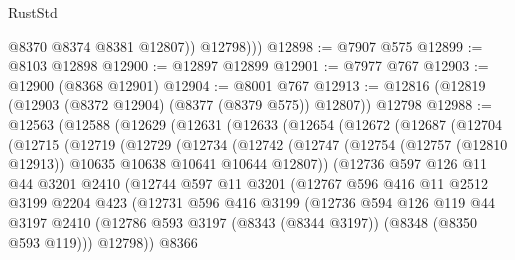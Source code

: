 \begin{lexlean}{RustStd}
\begin{coremodule}
              @8370
              @8374
              @8381
              @12807))
          @12798)))
@12898 := @7907 @575
@12899 := @8103 @12898
@12900 := @12897 @12899
@12901 := @7977 @767
@12903 := @12900 (@8368 @12901)
@12904 := @8001 @767
@12913 := @12816 (@12819 (@12903 (@8372 @12904) (@8377 (@8379 @575)) @12807)) @12798
@12988 := @12563
    (@12588
      (@12629
        (@12631
          (@12633
            (@12654
              (@12672
                (@12687
                  (@12704
                    (@12715
                      (@12719
                        (@12729
                          (@12734
                            (@12742
                              (@12747
                                (@12754
                                  (@12757 (@12810 @12913))
                                  @10635
                                  @10638
                                  @10641
                                  @10644
                                  @12807))
                              (@12736
                                @597
                                @126
                                @11
                                @44
                                @3201
                                @2410
                                (@12744
                                  @597
                                  @11
                                  @3201
                                  (@12767
                                    @596
                                    @416
                                    @11
                                    @2512
                                    @3199
                                    @2204
                                    @423
                                    (@12731
                                      @596
                                      @416
                                      @3199
                                      (@12736
                                        @594
                                        @126
                                        @119
                                        @44
                                        @3197
                                        @2410
                                        (@12786
                                          @593
                                          @3197
                                          (@8343 (@8344 @3197))
                                          (@8348 (@8350 @593 @119)))
                                        @12798))
                                    @8366

\end{coremodule}
\end{lexlean}
